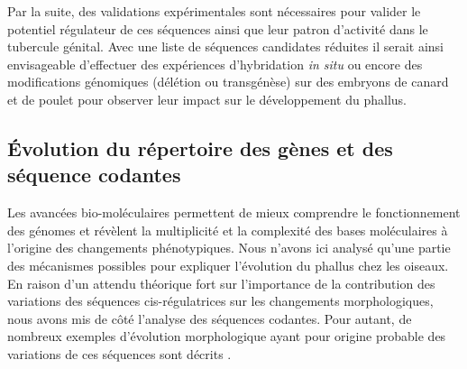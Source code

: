 Par la suite, des validations expérimentales sont nécessaires pour valider le potentiel régulateur de ces séquences ainsi que leur patron d’activité dans le tubercule génital. Avec une liste de séquences candidates réduites il serait ainsi envisageable d’effectuer des expériences d’hybridation \textit{in situ} ou encore des modifications génomiques (délétion ou transgénèse) sur des embryons de canard et de poulet pour observer leur impact sur le développement du phallus.

\subsection{Évolution du répertoire des gènes et des séquence codantes}

Les avancées bio-moléculaires permettent de mieux comprendre le fonctionnement des génomes et révèlent la multiplicité et la complexité des bases moléculaires à l’origine des changements phénotypiques. Nous n’avons ici analysé qu’une partie des mécanismes possibles pour expliquer l’évolution du phallus chez les oiseaux. En raison d’un attendu théorique fort sur l’importance de la contribution des variations des séquences \gls{cis}-régulatrices sur les changements morphologiques, nous avons mis de côté l’analyse des séquences codantes. Pour autant, de nombreux exemples d’évolution morphologique ayant pour origine probable des variations de ces séquences sont décrits \citep{stern_loci_2008, burga_genetic_2017, sharma_genomics_2018}. \\

